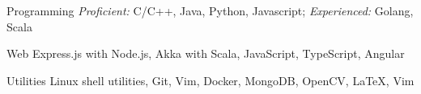 \begin{cvskills}

  \cvskill
  {Programming}
  {\textit{Proficient: } C/C++, Java, Python, Javascript; \hspace{0.3cm}
    \textit{Experienced: } Golang, Scala}

  \cvskill
  {Web}
  {Express.js with Node.js, Akka with Scala, JavaScript, TypeScript, Angular}

  \cvskill
  {Utilities}
  {Linux shell utilities, Git, Vim, Docker,
    MongoDB, OpenCV, \LaTeX, Vim}

\end{cvskills}

